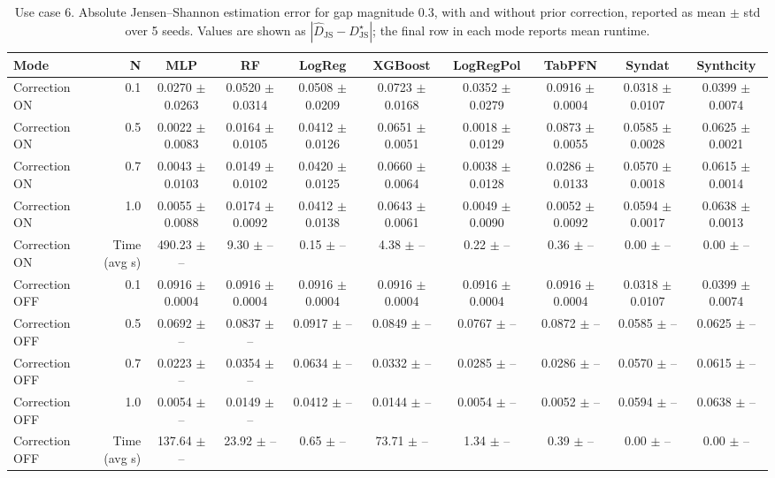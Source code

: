 \begin{table}[ht]
\centering
\small
\setlength{\tabcolsep}{3pt}
\caption{Use case 6. Absolute Jensen--Shannon estimation error for gap magnitude $0.3$, with and without prior correction, reported as mean $\pm$ std over 5 seeds. Values are shown as $|\widehat{D}_{\mathrm{JS}} - D_{\mathrm{JS}}^{\star}|$; the final row in each mode reports mean runtime.}
\label{tab:uc6_gap_0p3_on_off_mean_std}
\begin{tabular}{lrcccccccc}
\toprule
Mode & N & MLP & RF & LogReg & XGBoost & LogRegPol & TabPFN & Syndat & Synthcity \\
\midrule
Correction ON & 0.1 & 0.0270 $\pm$ 0.0263 & 0.0520 $\pm$ 0.0314 & 0.0508 $\pm$ 0.0209 & 0.0723 $\pm$ 0.0168 & 0.0352 $\pm$ 0.0279 & 0.0916 $\pm$ 0.0004 & 0.0318 $\pm$ 0.0107 & 0.0399 $\pm$ 0.0074 \\
Correction ON & 0.5 & 0.0022 $\pm$ 0.0083 & 0.0164 $\pm$ 0.0105 & 0.0412 $\pm$ 0.0126 & 0.0651 $\pm$ 0.0051 & 0.0018 $\pm$ 0.0129 & 0.0873 $\pm$ 0.0055 & 0.0585 $\pm$ 0.0028 & 0.0625 $\pm$ 0.0021 \\
Correction ON & 0.7 & 0.0043 $\pm$ 0.0103 & 0.0149 $\pm$ 0.0102 & 0.0420 $\pm$ 0.0125 & 0.0660 $\pm$ 0.0064 & 0.0038 $\pm$ 0.0128 & 0.0286 $\pm$ 0.0133 & 0.0570 $\pm$ 0.0018 & 0.0615 $\pm$ 0.0014 \\
Correction ON & 1.0 & 0.0055 $\pm$ 0.0088 & 0.0174 $\pm$ 0.0092 & 0.0412 $\pm$ 0.0138 & 0.0643 $\pm$ 0.0061 & 0.0049 $\pm$ 0.0090 & 0.0052 $\pm$ 0.0092 & 0.0594 $\pm$ 0.0017 & 0.0638 $\pm$ 0.0013 \\
Correction ON & Time (avg s) & 490.23 $\pm$ -- & 9.30 $\pm$ -- & 0.15 $\pm$ -- & 4.38 $\pm$ -- & 0.22 $\pm$ -- & 0.36 $\pm$ -- & 0.00 $\pm$ -- & 0.00 $\pm$ -- \\
Correction OFF & 0.1 & 0.0916 $\pm$ 0.0004 & 0.0916 $\pm$ 0.0004 & 0.0916 $\pm$ 0.0004 & 0.0916 $\pm$ 0.0004 & 0.0916 $\pm$ 0.0004 & 0.0916 $\pm$ 0.0004 & 0.0318 $\pm$ 0.0107 & 0.0399 $\pm$ 0.0074 \\
Correction OFF & 0.5 & 0.0692 $\pm$ -- & 0.0837 $\pm$ -- & 0.0917 $\pm$ -- & 0.0849 $\pm$ -- & 0.0767 $\pm$ -- & 0.0872 $\pm$ -- & 0.0585 $\pm$ -- & 0.0625 $\pm$ -- \\
Correction OFF & 0.7 & 0.0223 $\pm$ -- & 0.0354 $\pm$ -- & 0.0634 $\pm$ -- & 0.0332 $\pm$ -- & 0.0285 $\pm$ -- & 0.0286 $\pm$ -- & 0.0570 $\pm$ -- & 0.0615 $\pm$ -- \\
Correction OFF & 1.0 & 0.0054 $\pm$ -- & 0.0149 $\pm$ -- & 0.0412 $\pm$ -- & 0.0144 $\pm$ -- & 0.0054 $\pm$ -- & 0.0052 $\pm$ -- & 0.0594 $\pm$ -- & 0.0638 $\pm$ -- \\
Correction OFF & Time (avg s) & 137.64 $\pm$ -- & 23.92 $\pm$ -- & 0.65 $\pm$ -- & 73.71 $\pm$ -- & 1.34 $\pm$ -- & 0.39 $\pm$ -- & 0.00 $\pm$ -- & 0.00 $\pm$ -- \\
\bottomrule
\end{tabular}
\end{table}